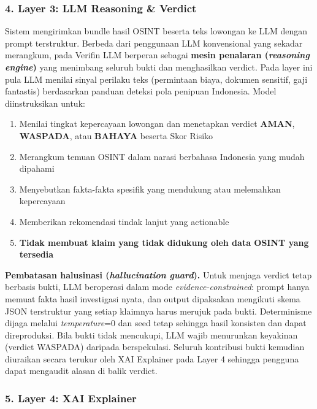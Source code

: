 \documentclass[12pt,a4paper]{article}
\newenvironment{sorotkuning}{%
  \begin{tcolorbox}[
    breakable,
    enhanced,
    frame hidden,
    boxrule=0pt,
    arc=0mm,
    sharp corners,
    colback=yellow!22,
    left=1.5mm, right=1.5mm, top=1.0mm, bottom=1.0mm,
    before skip=1.5pt, after skip=1.5pt
  ]%
}{%
  \end{tcolorbox}%
}
\begin{document}
\subsubsection*{4. Layer 3: LLM Reasoning \& Verdict}

\begin{sorotkuning}
Sistem mengirimkan bundle hasil OSINT beserta teks lowongan ke LLM
dengan prompt terstruktur. Berbeda dari penggunaan LLM konvensional yang sekadar merangkum, pada
Verifin LLM berperan sebagai \textbf{mesin penalaran (\textit{reasoning engine})} yang menimbang
seluruh bukti dan menghasilkan verdict. Pada layer ini pula LLM menilai sinyal perilaku teks
(permintaan biaya, dokumen sensitif, gaji fantastis) berdasarkan panduan deteksi pola penipuan
Indonesia. Model diinstruksikan untuk:
\begin{enumerate}[label=\textbf{\alph*.}, leftmargin=*, labelindent=0.65cm, labelsep=0.5em]
\item Menilai tingkat kepercayaan lowongan dan menetapkan verdict \textbf{AMAN}, \textbf{WASPADA}, atau \textbf{BAHAYA} beserta Skor Risiko
\item Merangkum temuan OSINT dalam narasi berbahasa Indonesia yang mudah dipahami
\item Menyebutkan fakta-fakta spesifik yang mendukung atau melemahkan kepercayaan
\item Memberikan rekomendasi tindak lanjut yang actionable
\item \textbf{Tidak membuat klaim yang tidak didukung oleh data OSINT yang tersedia}
\end{enumerate}

\textbf{Pembatasan halusinasi (\textit{hallucination guard}).} Untuk menjaga verdict tetap berbasis bukti, LLM beroperasi dalam mode
\textit{evidence-constrained}: prompt hanya memuat fakta hasil investigasi nyata, dan output
dipaksakan mengikuti skema JSON terstruktur yang setiap klaimnya harus merujuk pada bukti.
Determinisme dijaga melalui \textit{temperature}=0 dan seed tetap sehingga hasil konsisten dan
dapat direproduksi. Bila bukti tidak mencukupi, LLM wajib menurunkan keyakinan (verdict WASPADA)
daripada berspekulasi. Seluruh kontribusi bukti kemudian diuraikan secara terukur oleh XAI
Explainer pada Layer 4 sehingga pengguna dapat mengaudit alasan di balik verdict.
\end{sorotkuning}

\subsubsection*{5. Layer 4: XAI Explainer}
\end{document}
